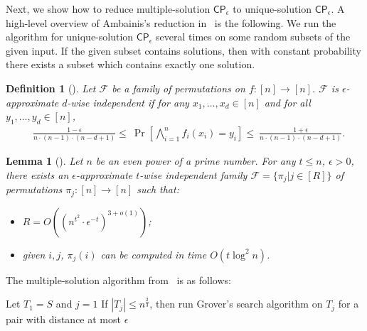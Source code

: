 \documentclass[10pt,a4paper]{article}
\newtheorem{lemma}[theorem]{Lemma}
\newtheorem{definition}[theorem]{Definition}
\newcommand{\eCP}{\mathsf{CP}_{\epsilon}}
\begin{document}
Next, we show how to reduce multiple-solution $\eCP$ to unique-solution $\eCP$. A high-level overview of Ambainis's reduction in~\cite{r5} is the following. We run the algorithm for unique-solution $\eCP$ several times on some random subsets of the given input. If the given subset contains solutions, then with constant probability there exists a subset which contains exactly one solution. 

\begin{definition}[\cite{r5,r27}]
Let $\mathcal{F}$ be a family of permutations on $f:[n]\rightarrow [n]$. $\mathcal{F}$ is $\epsilon$-approximate $d$-wise independent if for any $x_1,\dots,x_d\in [n]$ and for all $y_1,\dots,y_d\in [n]$, 
\begin{align}
    &\frac{1-\epsilon}{n\cdot(n-1)\cdot (n-d+1)}\leq ~ \Pr\left[\bigwedge_{i=1}^n f_i(x_i) = y_i\right] \leq ~  \frac{1+\epsilon}{n\cdot(n-1)\cdot (n-d+1)}.
\end{align}
\end{definition}

\begin{lemma}[\cite{r5,r27}]\label{lem:ehash}
Let $n$ be an even power of a prime number. For any $t\leq n$, $\epsilon>0$, there exists an $\epsilon$-approximate $t$-wise independent family $\mathcal{F}=\{\pi_j| j\in [R]\}$ of permutations $\pi_j: [n]\rightarrow [n]$ such that: 
\begin{itemize}
    \item $R = O\left( \left(n^{t^2}\cdot \epsilon^{-t}\right)^{3+o(1)}   \right)$; 
    \item given $i,j$, $\pi_j(i)$ can be computed in time $O(t\log^2 n)$.
\end{itemize}
\end{lemma}



The multiple-solution algorithm from~\cite{r5} is as follows: 
\begin{algorithm}[h]
    Let $T_1 = S$ and $j=1$\;
      If $|T_j|\leq n^{\frac{2}{3}}$, then run Grover's search algorithm on $T_j$ for a pair with distance at most $\epsilon$ \label{line:basecase}\;
    \caption{The algorithm for multiple $\epsilon$-close pair}
    \label{alg:m_to_1}
\end{algorithm}
\end{document}

